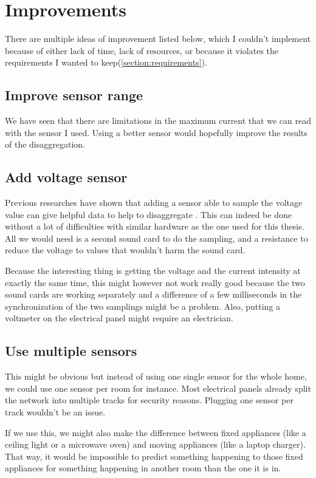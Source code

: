 \chapter{Improvements}\label{chapter-improvements}
There are multiple ideas of improvement listed below, which I couldn't implement because of either lack of time, lack of resources, or because it violates the requirements I wanted to keep(\autoref{section:requirements}).
\section{Improve sensor range}
We have seen that there are limitations in the maximum current that we can read with the sensor I used. Using a better sensor would hopefully improve the results of the disaggregation.

\section{Add voltage sensor}
Previous researches have shown that adding a sensor able to sample the voltage value can give helpful data to help to disaggregate \cite{bruneel2018energy,hassan2014empirical,lam2007novel}. This can indeed be done without a lot of difficulties with similar hardware as the one used for this thesis. All we would need is a second sound card to do the sampling, and a resistance to reduce the voltage to values that wouldn't harm the sound card.

Because the interesting thing is getting the voltage and the current intensity at exactly the same time, this might however not work really good because the two sound cards are working separately and a difference of a few milliseconds in the synchronization of the two samplings might be a problem. Also, putting a voltmeter on the electrical panel might require an electrician.

\section{Use multiple sensors}
This might be obvious but instead of using one single sensor for the whole home, we could use one sensor per room for instance. Most electrical panels already split the network into multiple tracks for security reasons. Plugging one sensor per track wouldn't be an issue. 

If we use this, we might also make the difference between fixed appliances (like a ceiling light or a microwave oven) and moving appliances (like a laptop charger). That way, it would be impossible to predict something happening to those fixed appliances for something happening in another room than the one it is in.

